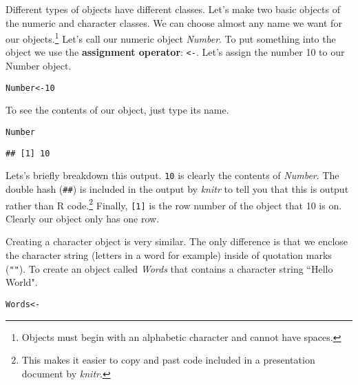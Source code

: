 Different types of objects have different classes. Let's make two basic objects of the numeric and character classes. We can choose almost any name we want for our objects.\footnote{Objects must begin with an alphabetic character and cannot have spaces.} Let's call our numeric object {\emph{Number}}. To put something into the object we use the {\bf{assignment operator}}: {\tt{\textless -}}. Let's assign the number 10 to our Number object.

\begin{knitrout}
\color{fgcolor}\begin{kframe}
\begin{alltt}
Number <- 10
\end{alltt}
\end{kframe}
\end{knitrout}


\noindent To see the contents of our object, just type its name.

\begin{knitrout}
\color{fgcolor}\begin{kframe}
\begin{alltt}
Number
\end{alltt}
\begin{verbatim}
## [1] 10
\end{verbatim}
\end{kframe}
\end{knitrout}


\noindent Lets's briefly breakdown this output. \texttt{10} is clearly the contents of {\emph{Number}}. The double hash (\texttt{\#\#}) is included in the output by {\emph{knitr}} to tell you that this is output rather than R code.\footnote{This makes it easier to copy and past code included in a presentation document by {\emph{knitr}}.} Finally, \texttt{[1]} is the row number of the object that 10 is on. Clearly our object only has one row.   

Creating a character object is very similar. The only difference is that we enclose the character string (letters in a word for example) inside of quotation marks ({\tt{""}}). To create an object called {\emph{Words}} that contains a character string ``Hello World".

\begin{knitrout}
\color{fgcolor}\begin{kframe}
\begin{alltt}
Words <- 
\end{alltt}
\end{kframe}
\end{knitrout}



